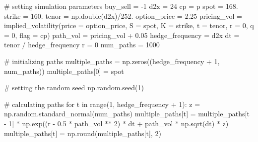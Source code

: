 \documentclass[
  letterpaper,
  DIV=11,
  numbers=noendperiod]{scrreprt}
\newenvironment{Shaded}{\begin{snugshade}}{\end{snugshade}}
\newcommand{\BuiltInTok}[1]{\textcolor[rgb]{0.00,0.23,0.31}{#1}}
\newcommand{\CommentTok}[1]{\textcolor[rgb]{0.37,0.37,0.37}{#1}}
\newcommand{\ControlFlowTok}[1]{\textcolor[rgb]{0.00,0.23,0.31}{#1}}
\newcommand{\DecValTok}[1]{\textcolor[rgb]{0.68,0.00,0.00}{#1}}
\newcommand{\FloatTok}[1]{\textcolor[rgb]{0.68,0.00,0.00}{#1}}
\newcommand{\KeywordTok}[1]{\textcolor[rgb]{0.00,0.23,0.31}{#1}}
\newcommand{\NormalTok}[1]{\textcolor[rgb]{0.00,0.23,0.31}{#1}}
\newcommand{\OperatorTok}[1]{\textcolor[rgb]{0.37,0.37,0.37}{#1}}
\newcommand{\StringTok}[1]{\textcolor[rgb]{0.13,0.47,0.30}{#1}}
\begin{document}
\begin{Shaded}
\begin{Highlighting}[]
\CommentTok{\# setting simulation parameters}
\NormalTok{buy\_sell }\OperatorTok{=} \OperatorTok{{-}}\DecValTok{1}
\NormalTok{d2x }\OperatorTok{=} \DecValTok{24}
\NormalTok{cp }\OperatorTok{=} \StringTok{\textquotesingle{}p\textquotesingle{}}
\NormalTok{spot }\OperatorTok{=} \FloatTok{168.}
\NormalTok{strike }\OperatorTok{=} \FloatTok{160.}
\NormalTok{tenor }\OperatorTok{=}\NormalTok{ np.double(d2x)}\OperatorTok{/}\FloatTok{252.}
\NormalTok{option\_price }\OperatorTok{=} \FloatTok{2.25}
\NormalTok{pricing\_vol }\OperatorTok{=}\NormalTok{ implied\_volatility(price }\OperatorTok{=}\NormalTok{ option\_price, S }\OperatorTok{=}\NormalTok{ spot, K }\OperatorTok{=}\NormalTok{ strike, t }\OperatorTok{=}\NormalTok{ tenor, r }\OperatorTok{=} \DecValTok{0}\NormalTok{, q }\OperatorTok{=} \DecValTok{0}\NormalTok{, flag }\OperatorTok{=}\NormalTok{ cp)}
\NormalTok{path\_vol }\OperatorTok{=}\NormalTok{ pricing\_vol }\OperatorTok{+} \FloatTok{0.05}
\NormalTok{hedge\_frequency }\OperatorTok{=}\NormalTok{ d2x}
\NormalTok{dt }\OperatorTok{=}\NormalTok{ tenor }\OperatorTok{/}\NormalTok{ hedge\_frequency}
\NormalTok{r }\OperatorTok{=} \DecValTok{0}
\NormalTok{num\_paths }\OperatorTok{=} \DecValTok{1000}


\CommentTok{\# initializing paths}
\NormalTok{multiple\_paths }\OperatorTok{=}\NormalTok{ np.zeros((hedge\_frequency }\OperatorTok{+} \DecValTok{1}\NormalTok{, num\_paths))}
\NormalTok{multiple\_paths[}\DecValTok{0}\NormalTok{] }\OperatorTok{=}\NormalTok{ spot}

\CommentTok{\# setting the random seed}
\NormalTok{np.random.seed(}\DecValTok{1}\NormalTok{)}

\CommentTok{\# calculating paths}
\ControlFlowTok{for}\NormalTok{ t }\KeywordTok{in} \BuiltInTok{range}\NormalTok{(}\DecValTok{1}\NormalTok{, hedge\_frequency }\OperatorTok{+} \DecValTok{1}\NormalTok{):}
\NormalTok{    z }\OperatorTok{=}\NormalTok{ np.random.standard\_normal(num\_paths) }
\NormalTok{    multiple\_paths[t] }\OperatorTok{=}\NormalTok{ multiple\_paths[t }\OperatorTok{{-}} \DecValTok{1}\NormalTok{] }\OperatorTok{*}\NormalTok{ np.exp((r }\OperatorTok{{-}} \FloatTok{0.5} \OperatorTok{*}\NormalTok{ path\_vol }\OperatorTok{**} \DecValTok{2}\NormalTok{) }\OperatorTok{*}\NormalTok{ dt }\OperatorTok{+}\NormalTok{ path\_vol }\OperatorTok{*}\NormalTok{ np.sqrt(dt) }\OperatorTok{*}\NormalTok{ z)}
\NormalTok{    multiple\_paths[t] }\OperatorTok{=}\NormalTok{ np.}\BuiltInTok{round}\NormalTok{(multiple\_paths[t], }\DecValTok{2}\NormalTok{)}


\end{Highlighting}
\end{Shaded}
\end{document}
